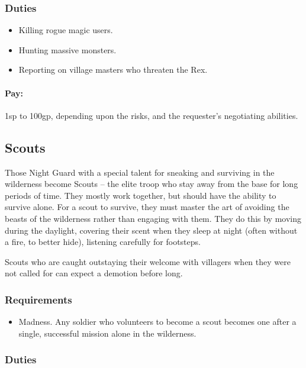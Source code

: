 \begin{multicols}{2}
\subsubsection{Duties}

\begin{itemize}
  \item
  Killing rogue magic users.
  \item
  Hunting massive monsters.
  \item
  Reporting on village masters who threaten the Rex.
\end{itemize}

\paragraph{Pay:} 1sp to 100gp, depending upon the risks, and the requester's negotiating abilities.

\subsection{Scouts}

Those Night Guard with a special talent for sneaking and surviving in the wilderness become Scouts -- the elite troop who stay away from the base for long periods of time.
They mostly work together, but should have the ability to survive alone.
For a scout to survive, they must master the art of avoiding the beasts of the wilderness rather than engaging with them.
They do this by moving during the daylight, covering their scent when they sleep at night (often without a fire, to better hide), listening carefully for footsteps.

Scouts who are caught outstaying their welcome with villagers when they were not called for can expect a demotion before long.

\subsubsection{Requirements}

\begin{itemize}
  \item
  Madness.
  Any soldier who volunteers to become a scout becomes one after a single, successful mission alone in the wilderness.
\end{itemize}

\subsubsection{Duties}


\end{multicols}
